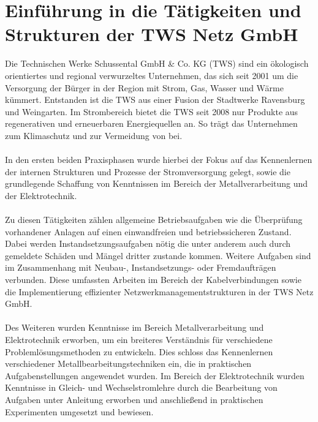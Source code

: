 \chapter{Einführung in die Tätigkeiten und Strukturen der TWS Netz GmbH}

Die Technischen Werke Schussental GmbH \& Co. KG (TWS) sind ein ökologisch orientiertes und regional verwurzeltes Unternehmen, das sich seit 2001 um die 
Versorgung der Bürger in der Region mit Strom, Gas, Wasser und Wärme kümmert. Entstanden ist die TWS aus einer Fusion der Stadtwerke Ravensburg und 
Weingarten. Im Strombereich bietet die TWS seit 2008 nur Produkte aus regenerativen und erneuerbaren Energiequellen an. So trägt das Unternehmen zum 
Klimaschutz und zur Vermeidung von  bei. 
\\\\
In den ersten beiden Praxisphasen wurde hierbei der Fokus auf das Kennenlernen der internen Strukturen und Prozesse der Stromversorgung gelegt, sowie die 
grundlegende Schaffung von Kenntnissen im Bereich der Metallverarbeitung und der Elektrotechnik. 
\\\\
Zu diesen Tätigkeiten zählen allgemeine Betriebsaufgaben wie die Überprüfung vorhandener Anlagen auf einen einwandfreien und betriebssicheren Zustand. 
Dabei werden Instandsetzungsaufgaben nötig die unter anderem auch durch gemeldete Schäden und Mängel dritter zustande kommen. Weitere Aufgaben sind im 
Zusammenhang mit Neubau-, Instandsetzungs- oder Fremdaufträgen verbunden. Diese umfassten Arbeiten im Bereich der Kabelverbindungen sowie die Implementierung 
effizienter Netzwerkmanagementstrukturen in der TWS Netz GmbH. 
\\\\
Des Weiteren wurden Kenntnisse im Bereich Metallverarbeitung und Elektrotechnik erworben, um ein breiteres Verständnis für verschiedene Problemlösungsmethoden 
zu entwickeln. Dies schloss das Kennenlernen verschiedener Metallbearbeitungstechniken ein, die in praktischen Aufgabenstellungen angewendet wurden. Im 
Bereich der Elektrotechnik wurden Kenntnisse in Gleich- und Wechselstromlehre durch die Bearbeitung von Aufgaben unter Anleitung erworben und anschließend 
in praktischen Experimenten umgesetzt und bewiesen.

\clearpage
